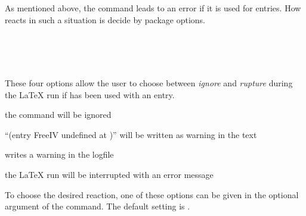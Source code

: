 As mentioned above, the command  leads to an error if it
is used for  entries. How  reacts in
such a situation is decide by package options.

\begin{Declaration}
\\
\\
\\
\end{Declaration}
%
%
These four options allow the user to choose between \emph{ignore} and
\emph{rupture} during the {\LaTeX} run if  has been used
with an  entry.

\begin{labeling}[\,--]{}
\item[\Option{adrFreeIVempty}] 
        the command  will be ignored
\item[\Option{adrFreeIVshow}] 
        ``(entry FreeIV undefined at )'' will be
        written as warning in the text
\item[\Option{adrFreeIVwarn}]
        writes a warning in the logfile
\item[\Option{adrFreeIVstop}]
        the {\LaTeX} run will be interrupted with an error message
\end{labeling}
To choose the desired reaction, one of these options can be given in
the optional argument of the  command. The default
setting is .
%


